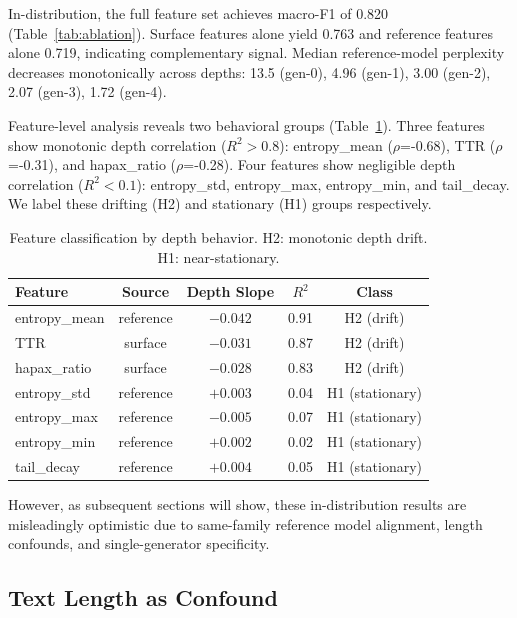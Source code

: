 \documentclass[11pt]{article}
\begin{document}
In-distribution, the full feature set achieves macro-F1 of 0.820 (Table~\ref{tab:ablation}).
Surface features alone yield 0.763 and reference features alone 0.719, indicating complementary signal.
Median reference-model perplexity decreases monotonically across depths: 13.5 (gen-0), 4.96 (gen-1), 3.00 (gen-2), 2.07 (gen-3), 1.72 (gen-4).

Feature-level analysis reveals two behavioral groups (Table~\ref{tab:h1h2}).
Three features show monotonic depth correlation ($R^2 > 0.8$): entropy\_mean ($\rho$=-0.68), TTR ($\rho$=-0.31), and hapax\_ratio ($\rho$=-0.28).
Four features show negligible depth correlation ($R^2 < 0.1$): entropy\_std, entropy\_max, entropy\_min, and tail\_decay.
We label these drifting (H2) and stationary (H1) groups respectively.

\begin{table}[h]
\centering
\caption{Feature classification by depth behavior. H2: monotonic depth drift. H1: near-stationary.}
\label{tab:h1h2}
\begin{tabular}{lcccc}
\toprule
Feature & Source & Depth Slope & $R^2$ & Class \\
\midrule
entropy\_mean & reference & $-0.042$ & 0.91 & H2 (drift) \\
TTR & surface & $-0.031$ & 0.87 & H2 (drift) \\
hapax\_ratio & surface & $-0.028$ & 0.83 & H2 (drift) \\
\midrule
entropy\_std & reference & $+0.003$ & 0.04 & H1 (stationary) \\
entropy\_max & reference & $-0.005$ & 0.07 & H1 (stationary) \\
entropy\_min & reference & $+0.002$ & 0.02 & H1 (stationary) \\
tail\_decay & reference & $+0.004$ & 0.05 & H1 (stationary) \\
\bottomrule
\end{tabular}
\end{table}

However, as subsequent sections will show, these in-distribution results are misleadingly optimistic due to same-family reference model alignment, length confounds, and single-generator specificity.

\subsection{Text Length as Confound}
\label{sec:length}
\end{document}
